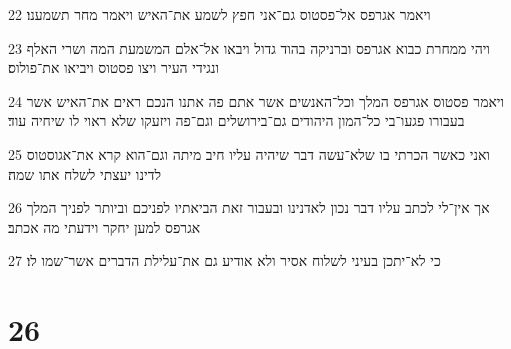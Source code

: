 \par 22 ויאמר אגרפס אל־פסטוס גם־אני חפץ לשמע את־האיש ויאמר מחר תשמענו׃
\par 23 ויהי ממחרת כבוא אגרפס וברניקה בהוד גדול ויבאו אל־אלם המשמעת המה ושרי האלף ונגידי העיר ויצו פסטוס ויביאו את־פולוס׃
\par 24 ויאמר פסטוס אגרפס המלך וכל־האנשים אשר אתם פה אתנו הנכם ראים את־האיש אשר בעבורו פגעו־בי כל־המון היהודים גם־בירושלים וגם־פה ויזעקו שלא ראוי לו שיחיה עוד׃
\par 25 ואני כאשר הכרתי בו שלא־עשה דבר שיהיה עליו חיב מיתה וגם־הוא קרא את־אגוסטוס לדינו יעצתי לשלח אתו שמה׃
\par 26 אך אין־לי לכתב עליו דבר נכון לאדנינו ובעבור זאת הביאתיו לפניכם וביותר לפניך המלך אגרפס למען יחקר וידעתי מה אכתב׃
\par 27 כי לא־יתכן בעיני לשלוח אסיר ולא אודיע גם את־עלילת הדברים אשר־שמו לו׃

\chapter{26}

